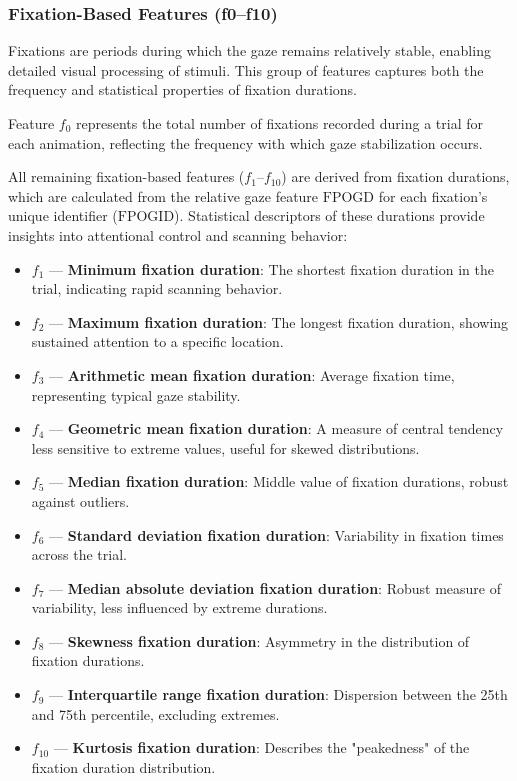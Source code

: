\documentclass{article}
\begin{document}
\subsubsection{Fixation-Based Features (f0–f10)}

Fixations are periods during which the gaze remains relatively stable, enabling detailed visual processing of stimuli. 
This group of features captures both the frequency and statistical properties of fixation durations.  

Feature \(f_0\) represents the total number of fixations recorded during a trial for each animation, reflecting the frequency with which gaze stabilization occurs.  

All remaining fixation-based features (\(f_1\)–\(f_{10}\)) are derived from fixation durations, which are calculated from the relative gaze feature \(\mathrm{FPOGD}\) for each fixation’s unique identifier (\(\mathrm{FPOGID}\)). 
Statistical descriptors of these durations provide insights into attentional control and scanning behavior:

\begin{itemize}
    \item \(f_1\) — \textbf{Minimum fixation duration}: The shortest fixation duration in the trial, indicating rapid scanning behavior.
    \item \(f_2\) — \textbf{Maximum fixation duration}: The longest fixation duration, showing sustained attention to a specific location.
    \item \(f_3\) — \textbf{Arithmetic mean fixation duration}: Average fixation time, representing typical gaze stability.
    \item \(f_4\) — \textbf{Geometric mean fixation duration}: A measure of central tendency less sensitive to extreme values, useful for skewed distributions.
    \item \(f_5\) — \textbf{Median fixation duration}: Middle value of fixation durations, robust against outliers.
    \item \(f_6\) — \textbf{Standard deviation fixation duration}: Variability in fixation times across the trial.
    \item \(f_7\) — \textbf{Median absolute deviation fixation duration}: Robust measure of variability, less influenced by extreme durations.
    \item \(f_8\) — \textbf{Skewness fixation duration}: Asymmetry in the distribution of fixation durations.
    \item \(f_9\) — \textbf{Interquartile range fixation duration}: Dispersion between the 25th and 75th percentile, excluding extremes.
    \item \(f_{10}\) — \textbf{Kurtosis fixation duration}: Describes the "peakedness" of the fixation duration distribution.
\end{itemize}
\end{document}

